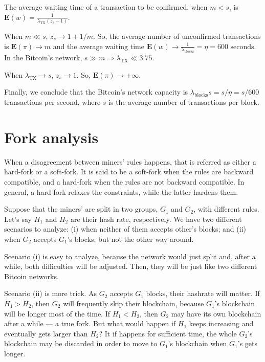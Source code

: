 The average waiting time of a transaction to be confirmed, when $m < s$, is $\mathbf{E}(w) = \frac{1}{\lambda_{\text{TX}} (z_s-1)}$.

When $m \ll s$, $z_s \rightarrow 1 + 1/m$. So, the average number of unconfirmed transactions is $\mathbf{E}(\pi) \rightarrow m$ and the average waiting time $\mathbf{E}(w) \rightarrow \frac{1}{\lambda_{\text{blocks}}} = \eta = 600 \text{ seconds}$. In the Bitcoin's network, $s \gg m \Rightarrow \lambda_{\text{TX}} \ll 3.75$.

When $\lambda_{\text{TX}} \rightarrow s$, $z_s \rightarrow 1$. So, $\mathbf{E}(\pi) \rightarrow +\infty$.

Finally, we conclude that the Bitcoin's network capacity is $\lambda_{\text{blocks}} s = s/\eta = s/600$ transactions per second, where $s$ is the average number of transactions per block.


\section{Fork analysis}


When a disagreement between miners' rules happens, that is referred as either a hard-fork or a soft-fork. It is said to be a soft-fork when the rules are backward compatible, and a hard-fork when the rules are not backward compatible. In general, a hard-fork relaxes the constraints, while the latter hardens them.

Suppose that the miners' are split in two groups, $G_1$ and $G_2$, with different rules. Let's say $H_1$ and $H_2$ are their hash rate, respectively. We have two different scenarios to analyze: (i) when neither of them accepts other's blocks; and (ii) when $G_2$ accepts $G_1$'s blocks, but not the other way around.

Scenario (i) is easy to analyze, because the network would just split and, after a while, both difficulties will be adjusted. Then, they will be just like two different Bitcoin networks.

Scenario (ii) is more trick. As $G_2$ accepts $G_1$ blocks, their hashrate will matter. If $H_1 > H_2$, then $G_2$ will frequently skip their blockchain, because $G_1$'s blockchain will be longer most of the time. If $H_1 < H_2$, then $G_2$ may have its own blockchain after a while --- a true fork. But what would happen if $H_1$ keeps increasing and eventually gets larger than $H_2$? It if happens for sufficient time, the whole $G_2$'s blockchain may be discarded in order to move to $G_1$'s blockchain when $G_1$'s gets longer.

